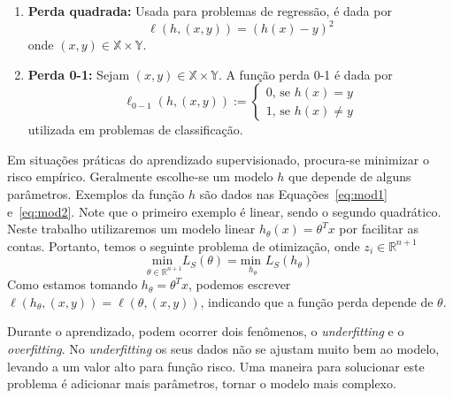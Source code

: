 \documentclass[
	12pt,				%
    oneside,			%
	a4paper,			%
	english,			%
	french,				%
	spanish,			%
	brazil,				%
	]{abntex2}
\begin{document}
                \begin{enumerate}
                    \item \textbf{Perda quadrada:} Usada para problemas de regressão, é dada por
                    \begin{equation*}
                        \ell(h,(x,y)) = (h(x) - y)^2
                    \end{equation*}
                    onde $(x,y) \in \mathbb{X}\times \mathbb{Y}$.
                    \item \textbf{Perda 0-1:} Sejam $(x,y) \in \mathbb{X}\times \mathbb{Y}$. A função perda 0-1 é dada por
                    \begin{equation*}
                        \ell_{0-1}(h,(x,y)) := \left \{
                        \begin{aligned}
                            0\mbox{, se }h(x) = y \\
                            1\mbox{, se }h(x) \neq y
                        \end{aligned}
                        \right.
                    \end{equation*}
                    utilizada em problemas de classificação.
                \end{enumerate}

                Em situações práticas do aprendizado supervisionado, procura-se minimizar o risco empírico. Geralmente escolhe-se um modelo $h$ que depende de alguns parâmetros. Exemplos da função $h$ são dados nas Equações~\eqref{eq:mod1} e~\eqref{eq:mod2}. Note que o primeiro exemplo é linear, sendo o segundo quadrático. Neste trabalho utilizaremos um modelo linear $h_\theta(x) = \theta^Tx$ por facilitar as contas.
                Portanto, temos o seguinte problema de otimização, onde $z_i \in \mathbb{R}^{n+1}$
                \begin{equation*}
                    \underset{\theta \in \mathbb{R}^{n+1}}{\text{min }} L_S(\theta) = \underset{h_\theta}{\text{min }} L_S(h_\theta)
                \end{equation*}
                Como estamos tomando $h_\theta = \theta^Tx$, podemos escrever $\ell(h_\theta, (x,y)) = \ell(\theta,(x,y))$, indicando que a função perda depende de $\theta$.

                Durante o aprendizado, podem ocorrer dois fenômenos, o \emph{underfitting} e o \emph{overfitting}. No \emph{underfitting} os seus dados não se ajustam muito bem ao modelo, levando a um valor alto para função risco. Uma maneira para solucionar este problema é adicionar mais parâmetros, tornar o modelo mais complexo.
\end{document}

